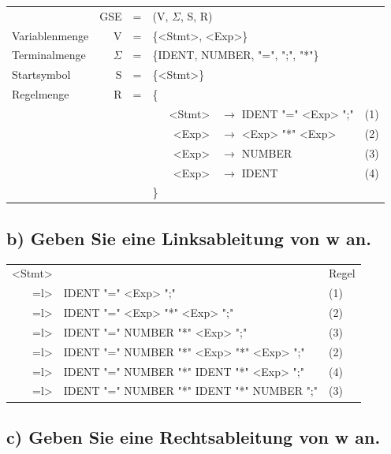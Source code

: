 \documentclass{article}
\begin{document}
\begin{center}
	\begin{tabular}{lrclrlc}
		& GSE & = & \multicolumn{4}{l}{(V, $\Sigma$, S, R)} \\
		Variablenmenge & V & = & \multicolumn{4}{l}{\{<Stmt>, <Exp>\}} \\
		Terminalmenge & $\Sigma$ & = & \multicolumn{4}{l}{\{IDENT, NUMBER, "=", ";", "*"\}} \\
		Startsymbol & S & = & \multicolumn{4}{l}{\{<Stmt>\}} \\
		Regelmenge & R & = & \{ \\
		& & & & <Stmt> & $\rightarrow$ IDENT "=" <Exp> ";" & (1) \\
		& & & & <Exp> & $\rightarrow$ <Exp> "*" <Exp> & (2) \\
		& & & & <Exp> & $\rightarrow$ NUMBER & (3) \\
		& & & & <Exp> & $\rightarrow$ IDENT & (4) \\
		& & & \}
	\end{tabular}
\end{center}

\subsection*{b) Geben Sie eine Linksableitung von w an.}

\begin{center}
	\begin{tabular}{rll}
		<Stmt> & & Regel \\
		=l> & IDENT "=" <Exp> ";" & (1) \\
		=l> & IDENT "=" <Exp> "*" <Exp> ";" & (2)\\
		=l> & IDENT "=" NUMBER "*" <Exp> ";" & (3)\\
		=l> & IDENT "=" NUMBER "*" <Exp> "*" <Exp> ";" & (2)\\
		=l> & IDENT "=" NUMBER "*" IDENT "*" <Exp> ";" & (4)\\
		=l> & IDENT "=" NUMBER "*" IDENT "*" NUMBER ";" & (3)\\
	\end{tabular}
\end{center}

\subsection*{c) Geben Sie eine Rechtsableitung von w an.}
\end{document}
